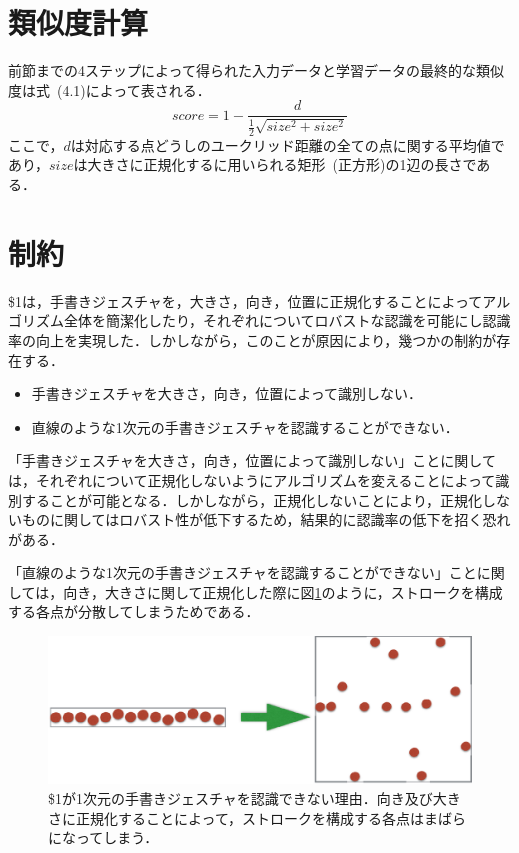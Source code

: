 \section{類似度計算}
前節までの4ステップによって得られた入力データと学習データの最終的な類似度は式~(4.1)によって表される．
\begin{equation}
score = 1 - \frac{d}{\frac{1}{2}\sqrt{size^2 + size^2}}
\end{equation}
ここで，$d$は対応する点どうしのユークリッド距離の全ての点に関する平均値であり，$size$は大きさに正規化するに用いられる矩形~(正方形)の1辺の長さである．

\section{制約}
\$1は，手書きジェスチャを，大きさ，向き，位置に正規化することによってアルゴリズム全体を簡潔化したり，それぞれについてロバストな認識を可能にし認識率の向上を実現した．しかしながら，このことが原因により，幾つかの制約が存在する．

\begin{itemize}
\item 手書きジェスチャを大きさ，向き，位置によって識別しない．
\item 直線のような1次元の手書きジェスチャを認識することができない．
\end{itemize}


「手書きジェスチャを大きさ，向き，位置によって識別しない」ことに関しては，それぞれについて正規化しないようにアルゴリズムを変えることによって識別することが可能となる．しかしながら，正規化しないことにより，正規化しないものに関してはロバスト性が低下するため，結果的に認識率の低下を招く恐れがある．

「直線のような1次元の手書きジェスチャを認識することができない」ことに関しては，向き，大きさに関して正規化した際に図\ref{fig:line}のように，ストロークを構成する各点が分散してしまうためである．

\begin{figure} [!h]
\centering
\includegraphics [width=0.8\columnwidth]{img/line.eps}
\caption{\$1が1次元の手書きジェスチャを認識できない理由．向き及び大きさに正規化することによって，ストロークを構成する各点はまばらになってしまう．}
\label{fig:line}
\end{figure}

